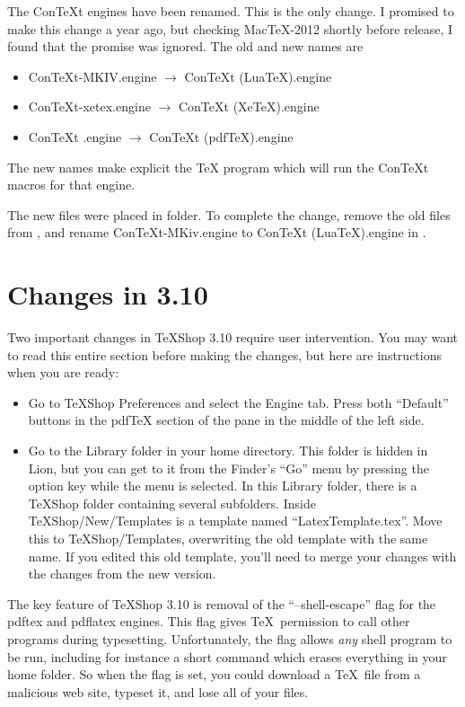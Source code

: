 \documentclass[11pt, oneside]{amsart}
\begin{document}
The ConTeXt engines have been renamed. This is the only change. I promised to make this change a year ago, but checking MacTeX-2012 shortly
before release, I found that the promise was ignored. The old and new names are
\begin{itemize}
\item ConTeXt-MKIV.engine $\rightarrow$ ConTeXt (LuaTeX).engine
\item ConTeXt-xetex.engine $\rightarrow$ ConTeXt (XeTeX).engine
\item ConTeXt .engine $\rightarrow$ ConTeXt (pdfTeX).engine
\end{itemize}
The new names make explicit the TeX program which will run the ConTeXt macros for that engine.

The new files were placed in   folder. To complete the change,
remove the old files from , and rename
 ConTeXt-MKiv.engine to ConTeXt (LuaTeX).engine  in .

\section{Changes in 3.10}

Two important changes in TeXShop 3.10 require user intervention. You may want to read this entire section before making the changes, but here are instructions when you are ready:
\begin{itemize}
\item Go to TeXShop Preferences and select the Engine tab. Press both ``Default'' buttons in the pdfTeX section of the pane in the middle of the left side.
\item Go to the Library folder in your home directory. This folder is hidden in Lion, but you can get to it from the Finder's ``Go'' menu by pressing the option key while the menu is selected.  In this Library folder, there is a TeXShop folder containing several subfolders. Inside TeXShop/New/Templates is a template named
``LatexTemplate.tex''. Move this to TeXShop/Templates, overwriting the old template with the same name. If you edited this old template, you'll need to merge
your changes with the changes from the new version.
\end{itemize}

The key feature of TeXShop 3.10 is removal of the ``--shell-escape'' flag for the pdftex and pdflatex engines. This flag gives \TeX\  permission to
call other programs during typesetting. Unfortunately, the flag allows {\em any} shell program to be run, including for instance a short command which erases everything in your home folder. So when the flag is set, you could download a \TeX\ file from a malicious web site, typeset it, and lose all of your files.
\end{document}
